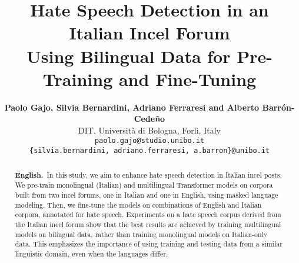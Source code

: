 \documentclass[11pt]{article}
\title{Hate Speech Detection in an Italian Incel Forum \\ Using Bilingual Data for Pre-Training and Fine-Tuning}
\author{\textbf{Paolo Gajo, Silvia Bernardini, Adriano Ferraresi and Alberto Barr\'on-Cede\~no} \\
  DIT, Universit\`a di Bologna, Forl\`i, Italy \\
  {\tt paolo.gajo@studio.unibo.it}\\
  {\tt \{silvia.bernardini, adriano.ferraresi, a.barron\}@unibo.it}}
\date{}
\begin{document}
\maketitle
\begin{abstract}
\textbf{English.}~In this study, we aim to enhance hate speech detection in Italian incel posts.
We pre-train monolingual (Italian) and multilingual Transformer models on corpora built from two incel forums, one in Italian and one in English, using masked language modeling. Then, we fine-tune the models on combinations of English and Italian corpora, annotated for hate speech.
Experiments on a hate speech corpus derived from the Italian incel forum show that the best results are achieved by training multilingual models on bilingual data,
rather than training monolingual models on Italian-only data. This emphasizes the importance of using training and testing data from a similar linguistic domain, even when the languages differ.


\end{abstract}
\end{document}
